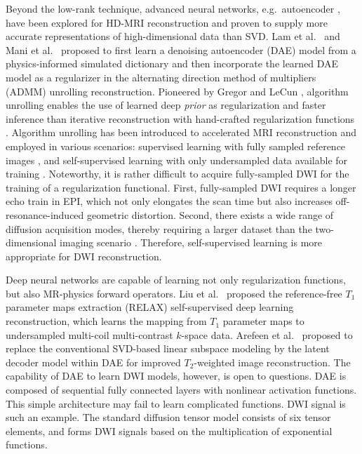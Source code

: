 \documentclass[journal,twoside,web]{ieeecolor}
\begin{document}
	Beyond the low-rank technique,
	advanced neural networks, e.g.~autoencoder \cite{hinton_2006_ae},
	have been explored for HD-MRI reconstruction and
	proven to supply more accurate representations of
	high-dimensional data than SVD.
	Lam et al.~\cite{lam_2019_mrsi} and Mani et al.~\cite{mani_2021_qmodel}
	proposed to first learn a denoising autoencoder (DAE) model
	from a physics-informed simulated dictionary
	and then incorporate the learned DAE model as a regularizer
	in the alternating direction method of multipliers (ADMM)
	\cite{boyd_2010_admm}
	unrolling reconstruction.
	Pioneered by Gregor and LeCun \cite{gregor_2010_algunroll},
	algorithm unrolling enables the use of learned deep \textit{prior}
	as regularization and faster inference than
	iterative reconstruction with hand-crafted regularization functions
	\cite{monga_2021_algunroll}.
	Algorithm unrolling has been introduced to
	accelerated MRI reconstruction and
	employed in various scenarios:
	supervised learning with fully sampled reference images
	\cite{hammernik_2018_varnet,aggarwal_2018_modl},
	and self-supervised learning
	with only undersampled data available for training
	\cite{yaman_2020_ssdu,yaman_2022_zs}.
	Noteworthy, it is rather difficult to acquire fully-sampled DWI
	for the training of a regularization functional.
	First, fully-sampled DWI requires a longer echo train in EPI,
	which not only elongates the scan time
	but also increases off-resonance-induced geometric distortion.
	Second, there exists a wide range of diffusion acquisition modes,
	thereby requiring a larger dataset than
	the two-dimensional imaging scenario \cite{knoll_2020_fastmri}.
	Therefore, self-supervised learning is more appropriate
	for DWI reconstruction.

	Deep neural networks are capable of learning
	not only regularization functions,
	but also MR-physics forward operators.
	Liu et al.~\cite{liu_2021_relax} proposed
	the reference-free $T_1$ parameter maps extraction (RELAX)
	self-supervised deep learning reconstruction,
	which learns the mapping from $T_1$ parameter maps to
	undersampled multi-coil multi-contrast $k$-space data.
	Arefeen et al.~\cite{arefeen_2023_latent} proposed
	to replace the conventional SVD-based linear subspace modeling
	\cite{huang_2012_t2basis}
	by the latent decoder model within DAE
	for improved $T_2$-weighted image reconstruction.
	The capability of DAE to learn DWI models, however,
	is open to questions.
	DAE is composed of sequential fully connected layers
	with nonlinear activation functions.
	This simple architecture may fail to learn complicated functions.
	DWI signal is such an example.
	The standard diffusion tensor model \cite{basser_1994_dmri}
	consists of six tensor elements,
	and forms DWI signals based on
	the multiplication of exponential functions.
\end{document}
